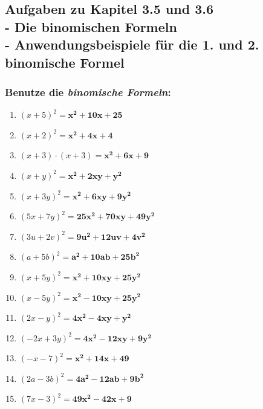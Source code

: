 \documentclass[a4paper,12pt]{article} %
\begin{document}
\subsection{Aufgaben zu Kapitel 3.5 und 3.6 \\
  - Die binomischen Formeln \\
  - Anwendungsbeispiele für die 1. und 2. binomische Formel}

\subsubsection{Benutze die \textit{binomische Formeln}:} %

\begin{enumerate}[label=\alph*)]

  \item \({(x + 5)}^2 = \mathbf{x^2 + 10x + 25}\) %

  \item \({(x + 2)}^2 = \mathbf{x^2 + 4x + 4}\) %

  \item \((x + 3) \cdot (x + 3) = \mathbf{x^2 + 6x + 9}\) %

  \item \({(x + y)}^2 = \mathbf{x^2 + 2xy + y^2}\) %

  \item \({(x + 3y)}^2 = \mathbf{x^2 + 6xy + 9y^2}\) %

  \item \({(5x + 7y)}^2 = \mathbf{25x^2 + 70xy + 49y^2}\) %

  \item \({(3u + 2v)}^2 = \mathbf{9u^2 + 12uv + 4v^2}\) %

  \item \({(a + 5b)}^2 = \mathbf{a^2 + 10ab + 25b^2}\) %

  \item \({(x + 5y)}^2 = \mathbf{x^2 + 10xy + 25y^2}\) %

  \item \({(x - 5y)}^2 = \mathbf{x^2 - 10xy + 25y^2}\) %

  \item \({(2x - y)}^2 = \mathbf{4x^2 - 4xy + y^2}\) %

  \item \({(-2x + 3y)}^2 = \mathbf{4x^2 - 12xy + 9y^2}\) %

  \item \({(-x - 7)}^2 = \mathbf{x^2 + 14x + 49}\) %

  \item \({(2a - 3b)}^2 = \mathbf{4a^2 - 12ab + 9b^2}\) %

  \item \({(7x - 3)}^2 = \mathbf{49x^2 - 42x + 9}\) %

\end{enumerate}
\end{document}
